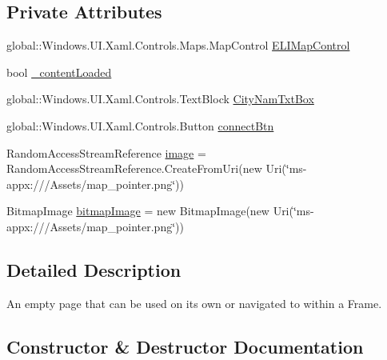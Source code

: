 \subsection*{Private Attributes}
\begin{DoxyCompactItemize}
\item 
global\+::\+Windows.\+U\+I.\+Xaml.\+Controls.\+Maps.\+Map\+Control \hyperlink{class_e_l_i_client_1_1_views_1_1_city_connection_view_ae5842a6a397aa27b2a4b1de03460afdf}{E\+L\+I\+Map\+Control}
\item 
bool \hyperlink{class_e_l_i_client_1_1_views_1_1_city_connection_view_a2af70649161e86207da6b08313814377}{\+\_\+content\+Loaded}
\item 
global\+::\+Windows.\+U\+I.\+Xaml.\+Controls.\+Text\+Block \hyperlink{class_e_l_i_client_1_1_views_1_1_city_connection_view_a0e546611d65e2aa0f7c1a5a8ae53b61a}{City\+Nam\+Txt\+Box}
\item 
global\+::\+Windows.\+U\+I.\+Xaml.\+Controls.\+Button \hyperlink{class_e_l_i_client_1_1_views_1_1_city_connection_view_a7acc73c0064df6161d66500404d74dee}{connect\+Btn}
\item 
Random\+Access\+Stream\+Reference \hyperlink{class_e_l_i_client_1_1_views_1_1_city_connection_view_a498a1c4fc7826caab708fbd5148a92c5}{image} = Random\+Access\+Stream\+Reference.\+Create\+From\+Uri(new Uri(\char`\"{}ms-\/appx\+:///Assets/map\+\_\+pointer.\+png\char`\"{}))
\item 
Bitmap\+Image \hyperlink{class_e_l_i_client_1_1_views_1_1_city_connection_view_a276cb706f6ba57c6c4529e28e6e3cbce}{bitmap\+Image} = new Bitmap\+Image(new Uri(\char`\"{}ms-\/appx\+:///Assets/map\+\_\+pointer.\+png\char`\"{}))
\end{DoxyCompactItemize}


\subsection{Detailed Description}
An empty page that can be used on its own or navigated to within a Frame. 



\subsection{Constructor \& Destructor Documentation}
\mbox{\label{class_e_l_i_client_1_1_views_1_1_city_connection_view_a7cbd9995c6d5b65090de9dc901ca56ab}} 
